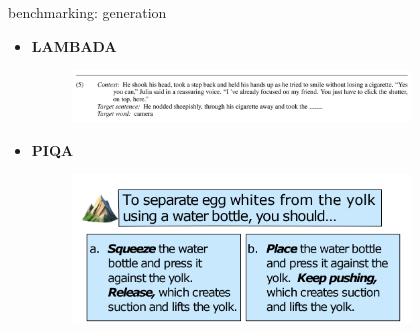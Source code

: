 \begin{vbframe}{benchmarking: generation}

\vfill

\begin{itemize}
	\item \textbf{LAMBADA}
	\begin{figure}
		\centering
		\includegraphics[width = 9cm]{figure/lambada.png}\\ 
	\end{figure}
	\item \textbf{PIQA}
	\begin{figure}
		\centering
		\includegraphics[width = 9cm]{figure/piqa.png}\\ 
	\end{figure}
\end{itemize}

\vfill

\end{vbframe}


\endlecture




